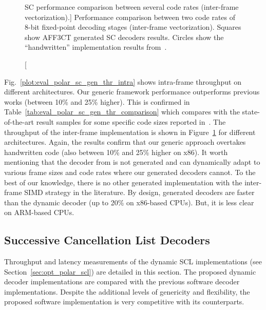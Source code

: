 \begin{figure}[htp]
  \centering
  \quad
  \caption
    [SC performance comparison between several code rates (inter-frame
     vectorization).]
    {Performance comparison between two code rates of 8-bit fixed-point decoding
     stages (inter-frame vectorization). Squares show AFF3CT generated SC
     decoders results. Circles show the ``handwritten'' implementation results
     from~\cite{LeGal2015a}.}
  \label{plot:eval_polar_sc_gen_thr_inter}
\end{figure}

Fig.~\ref{plot:eval_polar_sc_gen_thr_intra} shows \AFFECT intra-frame throughput
on different architectures. Our generic framework performance outperforms
previous works (between 10\% and 25\% higher). This is confirmed in
Table~\ref{tab:eval_polar_sc_gen_thr_comparison} which compares \AFFECT with the
state-of-the-art result samples for some specific code sizes reported
in~\cite{Sarkis2014}. The throughput of the inter-frame implementation is shown
in Figure~\ref{plot:eval_polar_sc_gen_thr_inter} for different architectures.
Again, the results confirm that our generic approach overtakes handwritten code
(also between 10\% and 25\% higher on x86). It worth mentioning that the decoder
from \cite{LeGal2015a} is not generated and can dynamically adapt to various
frame sizes and code rates where our generated decoders cannot. To the best of
our knowledge, there is no other generated implementation with the inter-frame
SIMD strategy in the literature. By design, generated decoders are faster than
the dynamic decoder (up to 20\% on x86-based CPUs). But, it is less clear on
ARM\R-based CPUs.

\subsection{Successive Cancellation List Decoders}

Throughput and latency measurements of the dynamic SCL implementations (see
Section~\ref{sec:opt_polar_scl}) are detailed in this section. The proposed
dynamic decoder implementations are compared with the previous software
decoder implementations. Despite the additional levels of genericity and
flexibility, the proposed software implementation is very competitive with its
counterparts.

